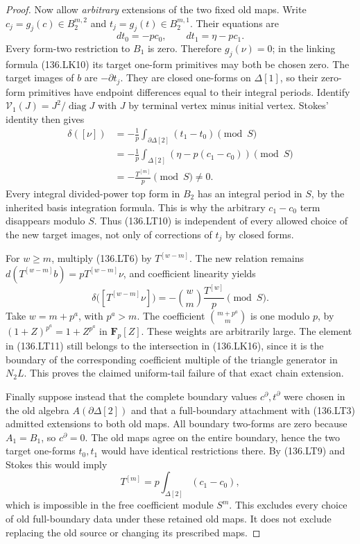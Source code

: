 \begin{proof}
Now allow \emph{arbitrary} extensions of the two fixed old maps.
Write \(c_j=g_j(c)\in B_2^{m,2}\) and
\(t_j=g_j(t)\in B_2^{m,1}\).  Their equations are
\[
              dt_0=-pc_0,
              \qquad dt_1=\eta-pc_1.
                                                               \tag{136.LT9}
\]
Every form-two restriction to \(B_1\) is zero.  Therefore
\(g_j(\nu)=0\); in the linking formula (136.LK10) its
target one-form primitives may both be chosen zero.
The target images of \(b\) are \(-\partial t_j\).
They are closed one-forms on \(\Delta[1]\), so their
zero-form primitives have endpoint differences equal to their
integral periods.  Identify
\(\mathcal V_1(J)=J^2/\operatorname{diag}J\) with \(J\)
by terminal vertex minus initial vertex.  Stokes' identity then
gives
\[
 \begin{aligned}
 \delta([\nu])
   &=-\frac{1}{p}
           \int_{\partial\Delta[2]}(t_1-t_0)\pmod S\\
   &=-\frac{1}{p}
           \int_{\Delta[2]}(\eta-p(c_1-c_0))\pmod S\\
   &=-\frac{T^{[m]}}p\pmod S\ne0.
 \end{aligned}                                                \tag{136.LT10}
\]
Every integral divided-power top form in \(B_2\) has an
integral period in \(S\), by the inherited basis integration
formula.  This is why the arbitrary \(c_1-c_0\) term
disappears modulo \(S\).  Thus (136.LT10) is independent
of every allowed choice of the new target images, not only
of corrections of \(t_j\) by closed forms.

For \(w\geq m\), multiply (136.LT6) by \(T^{[w-m]}\).
The new relation remains \(d(T^{[w-m]}b)=pT^{[w-m]}\nu\),
and coefficient linearity yields
\[
       \delta\bigl([T^{[w-m]}\nu]\bigr)
          =-\binom wm\frac{T^{[w]}}p\pmod S.
                                                               \tag{136.LT11}
\]
Take \(w=m+p^a\), with \(p^a>m\).  The coefficient
\(\binom{m+p^a}{m}\) is one modulo \(p\), by
\((1+Z)^{p^a}=1+Z^{p^a}\) in \(\mathbf F_p[Z]\).
These weights are arbitrarily large.  The element in (136.LT11)
still belongs to the intersection in (136.LK16), since it is
the boundary of the corresponding coefficient multiple of the
triangle generator in \(N_2L\).  This proves the claimed
uniform-tail failure of that exact chain extension.

Finally suppose instead that the complete boundary values
\(c^\partial,t^\partial\) were chosen in the old algebra
\(A(\partial\Delta[2])\) and that a full-boundary attachment
with (136.LT3) admitted extensions to both old maps.  All
boundary two-forms are zero because \(A_1=B_1\), so
\(c^\partial=0\).  The old maps agree on the entire
boundary, hence the two target one-forms \(t_0,t_1\)
would have identical restrictions there.  By (136.LT9) and
Stokes this would imply
\[
                    T^{[m]}
                      =p\int_{\Delta[2]}(c_1-c_0),
                                                               \tag{136.LT12}
\]
which is impossible in the free coefficient module \(S^m\).
This excludes every choice of old full-boundary data under
these retained old maps.  It does not exclude replacing the
old source or changing its prescribed maps.
\end{proof}

